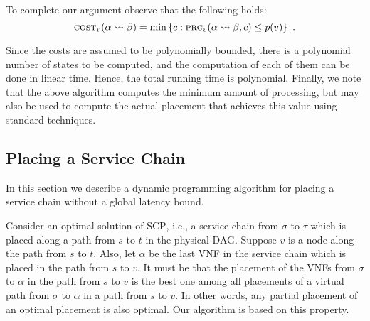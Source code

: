 \documentclass[11pt]{article}
\newcommand{\set}[1]{\left\{ #1 \right\}}
\newcommand{\scp}{\textsc{SCP}\xspace}
\newcommand{\cost}{\textsc{cost}\xspace}
\newcommand{\process}{\textsc{prc}\xspace}
\begin{document}
To complete our argument observe that the following holds:
\[
\cost_v(\alpha \leadsto \beta)
= \min \set{c : \process_v(\alpha \leadsto \beta, c) \leq p(v)}
~.
\]

Since the costs are assumed to be polynomially bounded, there is a
polynomial number of states to be computed, and the computation of
each of them can be done in linear time.  Hence, the total running
time is polynomial.  Finally, we note that the above algorithm
computes the minimum amount of processing, but may also be used to
compute the actual placement that achieves this value using standard
techniques.


\subsection{Placing a Service Chain}
\label{sec:chain-placement}

In this section we describe a dynamic programming algorithm for
placing a service chain without a global latency bound.  

Consider an optimal solution of \scp, i.e., a service chain from
$\sigma$ to $\tau$ which is placed along a path from $s$ to $t$ in the
physical DAG.  Suppose $v$ is a node along the path from $s$ to $t$.
Also, let $\alpha$ be the last VNF in the service chain which is
placed in the path from $s$ to $v$.  It must be that the placement of
the VNFs from $\sigma$ to $\alpha$ in the path from $s$ to $v$ is the
best one among all placements of a virtual path from $\sigma$ to
$\alpha$ in a path from $s$ to $v$.  In other words, any partial
placement of an optimal placement is also optimal.  Our algorithm is
based on this property.
\end{document}
